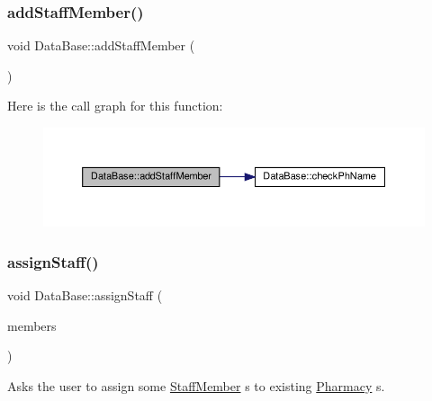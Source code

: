 \subsubsection{\texorpdfstring{add\+Staff\+Member()}{addStaffMember()}}
{\footnotesize\ttfamily void Data\+Base\+::add\+Staff\+Member (\begin{DoxyParamCaption}{ }\end{DoxyParamCaption})}

Here is the call graph for this function\+:\nopagebreak
\begin{figure}[H]
\begin{center}
\leavevmode
\includegraphics[width=350pt]{classDataBase_aed28994adfb33442ffd3469496150da8_cgraph}
\end{center}
\end{figure}
\mbox{\label{classDataBase_aecde8e08249b522ff9431c9feed57996}} 
\subsubsection{\texorpdfstring{assign\+Staff()}{assignStaff()}}
{\footnotesize\ttfamily void Data\+Base\+::assign\+Staff (\begin{DoxyParamCaption}\item[{vector$<$ \hyperlink{classStaffMember}{Staff\+Member} $>$}]{members }\end{DoxyParamCaption})}



Asks the user to assign some \hyperlink{classStaffMember}{Staff\+Member} \textquotesingle{}s to existing \hyperlink{classPharmacy}{Pharmacy} \textquotesingle{}s. 


